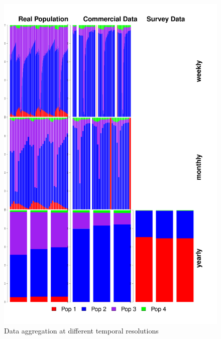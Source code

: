 \documentclass[review]{elsarticle}
\begin{document}
\begin{figure}[!ht]
	\includegraphics[width = \linewidth]{../analysis/Data_Aggregation_time}
	\caption{Data aggregation at different temporal resolutions}
	\label{fig:2}
\end{figure}	
\end{document}

